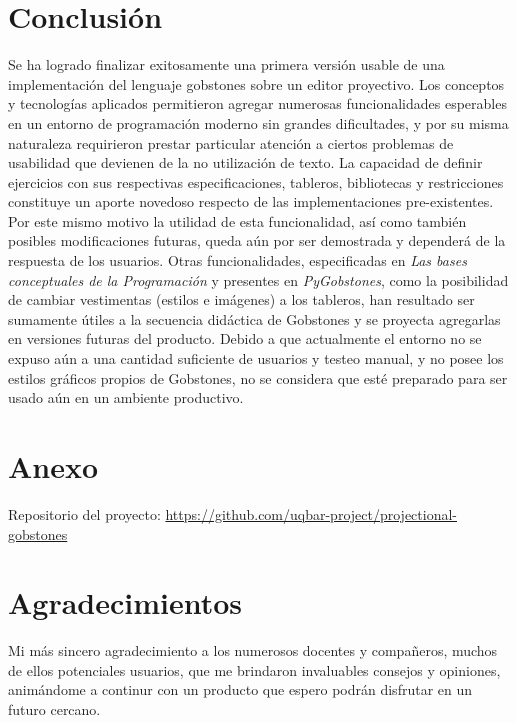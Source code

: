 \section{Conclusión}\label{conclusion}

Se ha logrado finalizar exitosamente una primera versión usable de una implementación del lenguaje gobstones sobre un editor proyectivo. Los conceptos y tecnologías aplicados permitieron agregar numerosas funcionalidades esperables en un entorno de programación moderno sin grandes dificultades, y por su misma naturaleza requirieron prestar particular atención a ciertos problemas de usabilidad que devienen de la no utilización de texto.
La capacidad de definir ejercicios con sus respectivas especificaciones, tableros, bibliotecas y restricciones constituye un aporte novedoso respecto de las implementaciones pre-existentes. Por este mismo motivo la utilidad de esta funcionalidad, así como también posibles modificaciones futuras, queda aún por ser demostrada y dependerá de la respuesta de los usuarios. Otras funcionalidades, especificadas en \textit{Las bases conceptuales de la Programación} \cite{Gobstones} y presentes en \textit{PyGobstones}, como la posibilidad de cambiar vestimentas (estilos e imágenes) a los tableros, han resultado ser sumamente útiles a la secuencia didáctica de Gobstones y se proyecta agregarlas en versiones futuras del producto.
Debido a que actualmente el entorno no se expuso aún a una cantidad suficiente de usuarios y testeo manual, y no posee los estilos gráficos propios de Gobstones, no se considera que esté preparado para ser usado aún en un ambiente productivo. 

\section{Anexo}\label{anexo}

Repositorio del proyecto: \url{https://github.com/uqbar-project/projectional-gobstones}

\section{Agradecimientos}

Mi más sincero agradecimiento a los numerosos docentes y compañeros, muchos de ellos potenciales usuarios, que me brindaron invaluables consejos y opiniones, animándome a continur con un producto que espero podrán disfrutar en un futuro cercano.
